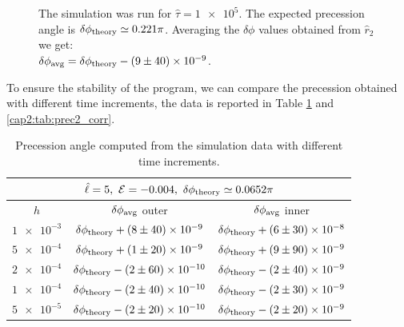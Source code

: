 \begin{figure}[h]
\begin{minipage}{0.48 \textwidth}
        \caption{The simulation was run for $\hat \tau = \num{1e5}$.
        The expected precession angle is $\delta \phi_{\rm theory} \simeq 0.221
        \pi$.
        Averaging the $\delta \phi$ values obtained from $\hat r_2$ we get: \\
        $\delta \phi_{\rm avg} = \delta \phi_{\rm theory} - (9 \pm 40) \times \num{e-9}$.}
        \label{cap2:fig:prec2_res_corr}
    \end{minipage}
\end{figure}

To ensure the stability of the program, we can compare the precession obtained
with different time increments, the data is reported in Table
\ref{cap2:tab:prec1_corr} and \ref{cap2:tab:prec2_corr}.

\begin{table}[h]
    \centering
    \begin{tabular}{|c|c|c|}
        \hline
        \multicolumn{3}{|c|}{$\hat \ell = 5, ~ \mathcal E = -0.004,
        ~ \delta \phi_{\rm theory} \simeq 0.0652 \pi$} \\
        \hline
        $h$ & $\delta \phi_{\rm avg}$ outer & $\delta \phi_{\rm avg}$ inner \\
        \hline
        $\num{1e-3}$ & $\delta \phi_{\rm theory} + (8 \pm 40) \times \num{e-9}$
        & $\delta \phi_{\rm theory} + (6 \pm 30) \times \num{e-8}$ \\
        \hline
        $\num{5e-4}$ & $\delta \phi_{\rm theory} + (1 \pm 20) \times \num{e-9}$
        & $\delta \phi_{\rm theory} + (9 \pm 90) \times \num{e-9}$ \\
        \hline
        $\num{2e-4}$ & $\delta \phi_{\rm theory} - (2 \pm 60) \times \num{e-10}$
        & $\delta \phi_{\rm theory} - (2 \pm 40) \times \num{e-9}$ \\
        \hline
        $\num{1e-4}$ & $\delta \phi_{\rm theory} - (2 \pm 40) \times \num{e-10}$
        & $\delta \phi_{\rm theory} - (2 \pm 30) \times \num{e-9}$ \\
        \hline
        $\num{5e-5}$ & $\delta \phi_{\rm theory} - (2 \pm 20) \times \num{e-10}$
        & $\delta \phi_{\rm theory} - (2 \pm 20) \times \num{e-9}$ \\
        \hline
    \end{tabular}
    \caption{Precession angle computed from the simulation data with different
    time increments.}
    \label{cap2:tab:prec1_corr}
\end{table}
